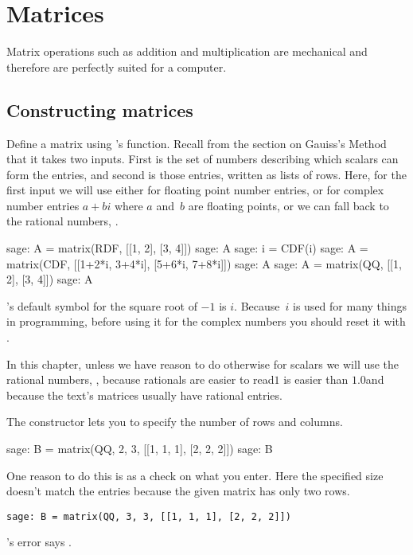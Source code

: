 \chapter{Matrices}

Matrix operations such as addition and multiplication
are mechanical and therefore are perfectly suited for 
a computer.



\section{Constructing matrices}
Define a matrix using \Sage's  function.
Recall from the section on Gauiss's Method that it takes two inputs.
First is the set of numbers describing which scalars can 
form the entries, and second is those entries, written as lists of rows.
Here, for the first input we will use either  for 
floating point number entries, 
or  for complex number entries $a+bi$ where 
$a$ and~$b$ are floating points,
or we can fall back to the rational numbers, .
\begin{sagecommandline}
sage: A = matrix(RDF, [[1, 2], [3, 4]])
sage: A
sage: i = CDF(i)
sage: A = matrix(CDF, [[1+2*i, 3+4*i], [5+6*i, 7+8*i]])
sage: A
sage: A = matrix(QQ, [[1, 2], [3, 4]])
sage: A                           
\end{sagecommandline}
\Sage's default symbol for the square root of $-1$ is $i$. 
Because~$i$ is used for many things in programming,
before using it for the complex numbers you should
reset it with .

In this chapter, unless we have reason to do otherwise
for scalars we will use the rational numbers, , 
because rationals are easier to read\Dash $1$ is easier than $1.0$\Dash and 
because the text's matrices usually have rational entries.

The  constructor lets you to specify the number of
rows and columns.
\begin{sagecommandline}
sage: B = matrix(QQ, 2, 3, [[1, 1, 1], [2, 2, 2]])  
sage: B
\end{sagecommandline}
One reason to do this is as a check on what you enter.
Here the specified size doesn't match the entries because
the given matrix has only two rows. 
\begin{lstlisting}[style=python]
sage: B = matrix(QQ, 3, 3, [[1, 1, 1], [2, 2, 2]])  
\end{lstlisting}
\Sage's error says
.

